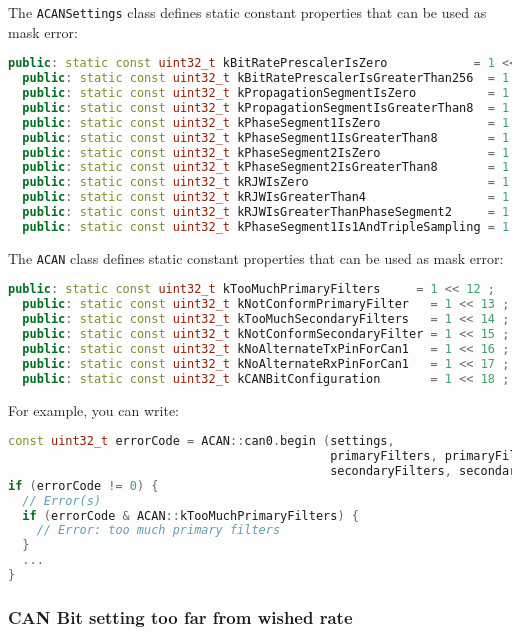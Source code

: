 \documentclass[10pt, a4paper, obeyspaces, openany]{extarticle}
\newcommand \subsubsectionLabel[2]{\subsubsection{#1}\label{subsubsec:#2}}
\begin{document}
The \texttt{ACANSettings} class defines static constant properties that can be used as mask error:
{ \small\begin{lstlisting}[language=c++]
  public: static const uint32_t kBitRatePrescalerIsZero            = 1 <<  0 ;
  public: static const uint32_t kBitRatePrescalerIsGreaterThan256  = 1 <<  1 ;
  public: static const uint32_t kPropagationSegmentIsZero          = 1 <<  2 ;
  public: static const uint32_t kPropagationSegmentIsGreaterThan8  = 1 <<  3 ;
  public: static const uint32_t kPhaseSegment1IsZero               = 1 <<  4 ;
  public: static const uint32_t kPhaseSegment1IsGreaterThan8       = 1 <<  5 ;
  public: static const uint32_t kPhaseSegment2IsZero               = 1 <<  6 ;
  public: static const uint32_t kPhaseSegment2IsGreaterThan8       = 1 <<  7 ;
  public: static const uint32_t kRJWIsZero                         = 1 <<  8 ;
  public: static const uint32_t kRJWIsGreaterThan4                 = 1 <<  9 ;
  public: static const uint32_t kRJWIsGreaterThanPhaseSegment2     = 1 << 10 ;
  public: static const uint32_t kPhaseSegment1Is1AndTripleSampling = 1 << 11 ;
\end{lstlisting}}

The \texttt{ACAN} class defines static constant properties that can be used as mask error:
{ \small\begin{lstlisting}[language=c++]
  public: static const uint32_t kTooMuchPrimaryFilters     = 1 << 12 ;
  public: static const uint32_t kNotConformPrimaryFilter   = 1 << 13 ;
  public: static const uint32_t kTooMuchSecondaryFilters   = 1 << 14 ;
  public: static const uint32_t kNotConformSecondaryFilter = 1 << 15 ;
  public: static const uint32_t kNoAlternateTxPinForCan1   = 1 << 16 ;
  public: static const uint32_t kNoAlternateRxPinForCan1   = 1 << 17 ;
  public: static const uint32_t kCANBitConfiguration       = 1 << 18 ;
\end{lstlisting}}

For example, you can write:
{ \small\begin{lstlisting}[language=c++]
const uint32_t errorCode = ACAN::can0.begin (settings,
                                             primaryFilters, primaryFilterCount,
                                             secondaryFilters, secondaryFilterCount) ;
if (errorCode != 0) {
  // Error(s)
  if (errorCode & ACAN::kTooMuchPrimaryFilters) {
    // Error: too much primary filters
  }
  ...
}
\end{lstlisting}}

\subsubsectionLabel{CAN Bit setting too far from wished rate}{CANBitTooFarError}
\end{document}
